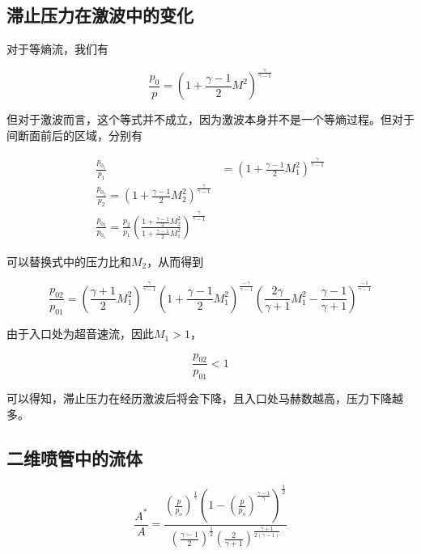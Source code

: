 \subsection{滞止压力在激波中的变化}

对于等熵流，我们有

\begin{equation*}
    \frac{p_{0}}{p}=\left(1+\frac{\gamma-1}{2} M^{2}\right)^{\frac{\gamma}{\gamma-1}}
\end{equation*}

但对于激波而言，这个等式并不成立，因为激波本身并不是一个等熵过程。但对于间断面前后的区域，分别有

\begin{align*}
    \frac{p_{0_{1}}}{p_{1}}&=\left(1+\frac{\gamma-1}{2} M_{1}^{2}\right)^{\frac{\gamma}{\gamma-1}}\\ 
    \frac{p_{0_{2}}}{p_{2}}=\left(1+\frac{\gamma-1}{2} M_{2}^{2}\right)^{\frac{\gamma}{\gamma-1}}\\ 
    \frac{p_{0_{2}}}{p_{0_{1}}}=\frac{p_{2}}{p_{1}}\left(\frac{1+\frac{\gamma-1}{2} M_{2}^{2}}{1+\frac{\gamma-1}{2} M_{1}^{2}}\right)^{\frac{\gamma}{\gamma-1}}
\end{align*}

可以替换式中的压力比和$M_2$，从而得到

\begin{equation*}
    \frac{p_{02}}{p_{01}}=\left(\frac{\gamma+1}{2} M_{1}^{2}\right)^{\frac{\gamma}{\gamma-1}}\left(1+\frac{\gamma-1}{2} M_{1}^{2}\right)^{\frac{-\gamma}{\gamma-1}}\left(\frac{2 \gamma}{\gamma+1} M_{1}^{2}-\frac{\gamma-1}{\gamma+1}\right)^{\frac{-1}{\gamma-1}}
\end{equation*}

由于入口处为超音速流，因此$M_1>1$，

\begin{equation*}
    \frac{p_{02}}{p_{01}}<1
\end{equation*}

可以得知，滞止压力在经历激波后将会下降，且入口处马赫数越高，压力下降越多。

\subsection{二维喷管中的流体}

\begin{equation*}
    \frac{A^{*}}{A}=\frac{\left(\frac{p}{p_{o}}\right)^{\frac{1}{\gamma}}\left(1-\left(\frac{p}{p_{o}}\right)^{\frac{\gamma-1}{\gamma}}\right)^{\frac{1}{2}}}{\left(\frac{\gamma-1}{2}\right)^{\frac{1}{2}}\left(\frac{2}{\gamma+1}\right)^{\frac{\gamma+1}{2(\gamma-1)}}}
\end{equation*}

